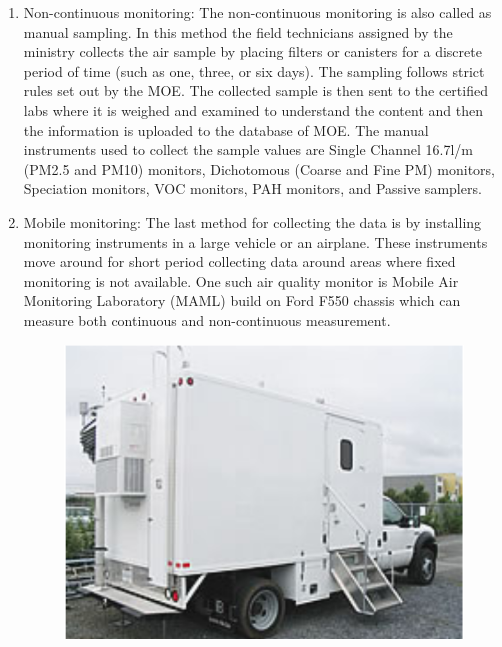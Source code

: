 \begin{enumerate}

  \item Non-continuous monitoring: The non-continuous monitoring is also called as manual sampling. In this method the field technicians assigned by the ministry collects the air sample by placing filters or canisters for a discrete period of time (such as one, three, or six days). The sampling follows strict rules set out by the MOE. The collected sample is then sent to the certified labs where it is weighed and examined to understand the content and then the information is uploaded to the database of MOE. The manual instruments used to collect the sample values are Single Channel 16.7l/m (PM2.5 and PM10) monitors, Dichotomous (Coarse and Fine PM) monitors, Speciation monitors, VOC monitors, PAH monitors, and Passive samplers.
  


  \item Mobile monitoring: The last method for collecting the data is by installing monitoring instruments in a large vehicle or an airplane. These instruments move around for short period collecting data around areas where fixed monitoring is not available. One such air quality monitor is  Mobile Air Monitoring Laboratory (MAML) \cite{MAML} build on Ford F550 chassis which can measure both continuous and non-continuous measurement. 
  
  \vspace{5mm}


  \begin{figure}[h]
    \begin{center}
    \includegraphics[scale= 0.65]{./images/figure38.png}
    \end{center}
   

\end{figure}
\end{enumerate}
